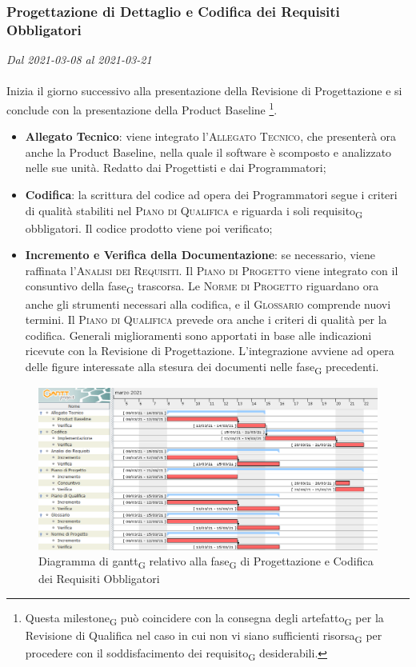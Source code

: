 \subsubsection{Progettazione di Dettaglio e Codifica dei Requisiti Obbligatori}

\textit{Dal 2021-03-08 al 2021-03-21}
\\\\
Inizia il giorno successivo alla presentazione della Revisione di Progettazione e si conclude con la presentazione della Product Baseline \footnote{Questa milestone\textsubscript{G} può coincidere con la consegna degli artefatto\textsubscript{G} per la Revisione di Qualifica nel caso in cui non vi siano sufficienti risorsa\textsubscript{G} per procedere con il soddisfacimento dei requisito\textsubscript{G} desiderabili.}.
\begin{itemize}
	\item \textbf{Allegato Tecnico}: viene integrato l'\textsc{Allegato Tecnico}, che presenterà ora anche la Product Baseline, nella quale il software è scomposto e analizzato nelle sue unità. Redatto dai Progettisti e dai Programmatori;
	\item \textbf{Codifica}: la scrittura del codice ad opera dei Programmatori segue i criteri di qualità stabiliti nel \textsc{Piano di Qualifica} e riguarda i soli requisito\textsubscript{G} obbligatori. Il codice prodotto viene poi verificato;
	\item \textbf{Incremento e Verifica della Documentazione}: se necessario, viene raffinata l'\textsc{Analisi dei Requisiti}. Il \textsc{Piano di Progetto} viene integrato con il consuntivo della fase\textsubscript{G} trascorsa.  Le \textsc{Norme di Progetto} riguardano ora anche gli strumenti necessari alla codifica, e il \textsc{Glossario} comprende nuovi termini. Il \textsc{Piano di Qualifica} prevede ora anche i criteri di qualità per la codifica. Generali miglioramenti sono apportati in base alle indicazioni ricevute con la Revisione di Progettazione. L'integrazione avviene ad opera delle figure interessate alla stesura dei documenti nelle fase\textsubscript{G} precedenti.
	
\end{itemize}


\begin{figure}[H]
	\centering
	\includegraphics[scale=0.52]{res/images/04_gantt_codifica_obbligatori.png}
	\caption{Diagramma di gantt\textsubscript{G} relativo alla fase\textsubscript{G} di Progettazione  e Codifica dei Requisiti Obbligatori}
\end{figure}



